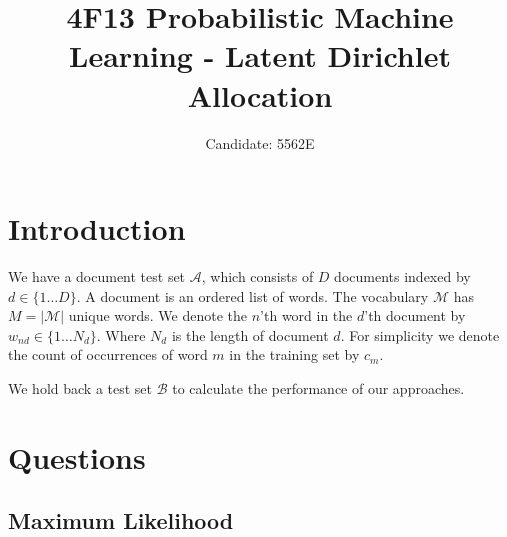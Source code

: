 \documentclass[]{article}
\title{4F13 Probabilistic Machine Learning - Latent Dirichlet Allocation}
\author{Candidate: 5562E}
\newcommand{\Acal}{\mathcal{A}}
\newcommand{\Bcal}{\mathcal{B}}
\newcommand{\Mcal}{\mathcal{M}}
\begin{document}


\setcounter{page}{1}
\maketitle

\tableofcontents

\section{Introduction}

We have a document test set $\Acal$, which consists of $D$ documents indexed by $d \in \{1 \dots D\}$. A document is an ordered list of words. The vocabulary $\Mcal$ has $M=|\Mcal|$ unique words. We denote the $n$'th word in the $d$'th document by $w_{nd} \in \{1 \dots N_d\}$. Where $N_d$ is the length of document $d$. For simplicity we denote the count of occurrences of word $m$ in the training set by $c_m$.

We hold back a test set $\Bcal$ to calculate the performance of our approaches.

\clearpage
\section{Questions}
\subsection{Maximum Likelihood}
\end{document}
